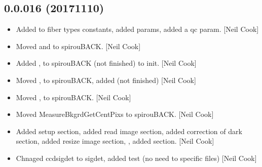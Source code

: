 \documentclass[a4paper,10pt,english]{report}
\begin{document}
\subsection{0.0.016 (2017\sphinxhyphen{}11\sphinxhyphen{}10)}
\label{\detokenize{misc/changelog:id554}}\begin{itemize}
\item {} 
Added  to fiber types constants, added  params, added a
qc param. {[}Neil Cook{]}

\item {} 
Moved  and
 to spirouBACK. {[}Neil Cook{]}

\item {} 
Added , 
to spirouBACK  (not finished) to init.
{[}Neil Cook{]}

\item {} 
Moved , 
to spirouBACK, added  (not finished) {[}Neil
Cook{]}

\item {} 
Moved , 
to spirouBACK. {[}Neil Cook{]}

\item {} 
Moved MeasureBkgrdGetCentPixs to spirouBACK. {[}Neil Cook{]}

\item {} 
Added setup section, added read image section, added correction of
dark section, added resize image section, , added  section.
{[}Neil Cook{]}

\item {} 
Chnaged ccdsigdet to sigdet, added test (no need to specific files)
{[}Neil Cook{]}

\end{itemize}
\end{document}
